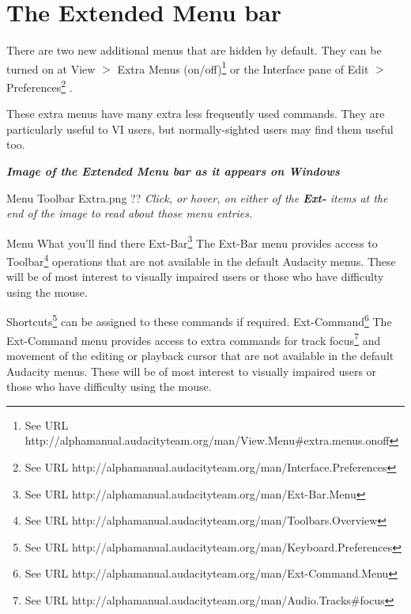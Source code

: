\section{
The Extended Menu bar
}


There are two new additional menus that are hidden by default.  They can be turned on at 
View \mbox{$>$} Extra Menus (on/off)\footnote{See URL http://alphamanual.audacityteam.org/man/View.Menu\#extra.menus.onoff}
 or the Interface pane of 
Edit \mbox{$>$} Preferences\footnote{See URL http://alphamanual.audacityteam.org/man/Interface.Preferences}
.

These extra menus have many extra less frequently used commands.  They are particularly useful to VI users, but normally-sighted users may find them useful too.

\textit{\textbf{Image of the Extended Menu bar as it appears on Windows}}




Menu Toolbar Extra.png
??
\textit{Click, or hover, on either of the \textbf{Ext-} items at the end of the image to read about those menu entries.}

Menu
What you'll find there
Ext-Bar\footnote{See URL http://alphamanual.audacityteam.org/man/Ext-Bar.Menu}
The Ext-Bar menu provides access to Toolbar\footnote{See URL http://alphamanual.audacityteam.org/man/Toolbars.Overview} operations that are not available in the default Audacity menus. These will be of most interest to visually impaired users or those who have difficulty using the mouse.

Shortcuts\footnote{See URL http://alphamanual.audacityteam.org/man/Keyboard.Preferences} can be assigned to these commands if required.
Ext-Command\footnote{See URL http://alphamanual.audacityteam.org/man/Ext-Command.Menu}
The Ext-Command menu provides access to extra commands for track focus\footnote{See URL http://alphamanual.audacityteam.org/man/Audio.Tracks\#focus} and movement of the editing or playback cursor that are not available in the default Audacity menus. These will be of most interest to visually impaired users or those who have difficulty using the mouse.

